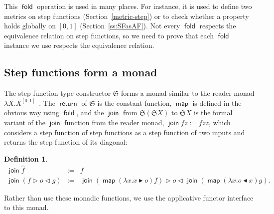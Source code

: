 \documentclass{elsarticle}
\newcommand{\assign}{:=}
\newcommand{\tmop}[1]{\ensuremath{\operatorname{#1}}}
\newtheorem{definition}{Definition}
\newcommand{\defEq}{\ensuremath{\assign}}
\newcommand{\pure}[1]{\ensuremath{\widehat{#1}}}
\newcommand{\SF}{\ensuremath{\mathfrak{S}}}
\newcommand{\glue}[3]{\ensuremath{#1 \vartriangleright #2 \vartriangleleft #3}}
\newcommand{\splitl}[2]{\ensuremath{#1 \blacktriangleright #2}}
\newcommand{\splitr}[2]{\ensuremath{#2 \blacktriangleleft #1}}
\begin{document}
This $\tmop{\mathsf{fold}}$ operation is used in many places. For instance, it
is used to define two metrics on step functions (Section~\ref{metric-step}) or
to check whether a property holds globally on $[0,1]$
(Section~\ref{ss:SFasAF}). Not every $\tmop{\mathsf{fold}}$ respects the
equivalence relation on step functions, so we need to prove that each
$\tmop{\mathsf{fold}}$ instance we use respects the equivalence relation.

\subsection{Step functions form a monad}\label{StepF-mon}The step function
type constructor $\SF$ forms a monad similar to the reader monad $\lambda X.
X^{[0,1]}$~{\cite{Wadler92b}}. The $\tmop{\mathsf{return}}$ of {\SF} is the
constant function, $\tmop{\mathsf{map}}$ is defined in the obvious way using
$\tmop{\mathsf{fold}}$, and the $\tmop{\mathsf{join}}$ from $\SF ( \SF X)$ to $\SF X$ is the formal
variant of the $\tmop{\mathsf{join}}$ function from the reader monad,
$\tmop{\mathsf{join}} f z \defEq f z z$, which considers a step function of
step functions as a step function of two inputs and returns the step function
of its diagonal:

\begin{definition}
  \begin{eqnarray*}
    \tmop{\mathsf{join}}  \pure{f} & \defEq & f\\
    \tmop{\mathsf{join}}  \left( \glue{f}{o}{g} \right) & \defEq &
    \glue{\splitl{\tmop{\mathsf{join}} ( \tmop{\mathsf{map}} (\lambda x.x}{o)
    f)}}{o}{\tmop{\mathsf{join}} ( \tmop{\mathsf{map}} (\lambda x.
    \splitr{x}{o}) g)} \text{.}
  \end{eqnarray*}
\end{definition}

Rather than use these monadic functions, we use the applicative functor
interface to this monad.
\end{document}
